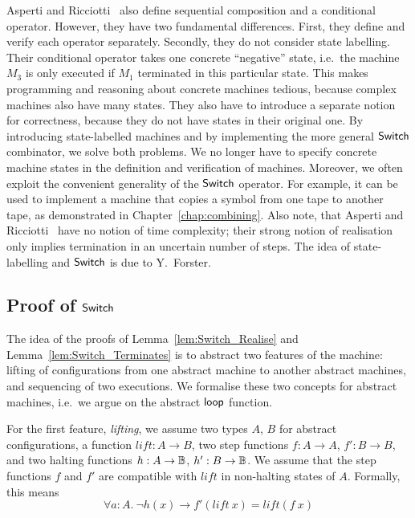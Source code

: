 Asperti and Ricciotti~\cite{asperti2015} also define sequential composition and a conditional operator.  However, they have two fundamental
differences.  First, they define and verify each operator separately.  Secondly, they do not consider state labelling.  Their conditional operator
takes one concrete ``negative'' state, i.e.\ the machine $M_3$ is only executed if $M_1$ terminated in this particular state.  This makes programming
and reasoning about concrete machines tedious, because complex machines also have many states.  They also have to introduce a separate notion for
correctness, because they do not have states in their original one.  By introducing state-labelled machines and by implementing the more general
$\mathsf{Switch}$ combinator, we solve both problems.  We no longer have to specify concrete machine states in the definition and verification of machines.
Moreover, we often exploit the convenient generality of the $\mathsf{Switch}$ operator.  For example, it can be used to implement a machine that copies a
symbol from one tape to another tape, as demonstrated in Chapter~\ref{chap:combining}.  Also note, that Asperti and Ricciotti~\cite{asperti2015} have
no notion of time complexity; their strong notion of realisation only implies termination in an uncertain number of steps.  The idea of
state-labelling and $\mathsf{Switch}$ is due to Y.~Forster.


\subsection{Proof of $\mathsf{Switch}$}
\label{sec:match-proofs}


The idea of the proofs of Lemma~\ref{lem:Switch_Realise} and Lemma~\ref{lem:Switch_Terminates} is to abstract two features of the machine: lifting of
configurations from one abstract machine to another abstract machines, and sequencing of two executions.  We formalise these two concepts for abstract
machines, i.e.\ we argue on the abstract $\mathsf{loop}$ function.

For the first feature, \textit{lifting}, we assume two types $A$, $B$ for abstract configurations, a function $lift : A \to B$, two step functions
$f : A \to A$, $f' : B \to B$, and two halting functions $h : A \rightarrow \mathbb{B}$, $h' : B \rightarrow \mathbb{B}$.  We assume that the step functions $f$ and $f'$ are
compatible with $lift$ in non-halting states of $A$.  Formally, this means
\begin{equation}
  \label{eq:loop_lift_assumption1}
  \forall a:A.~\lnot h(x) \rightarrow f' (lift~x) = lift (f~x)
\end{equation}

